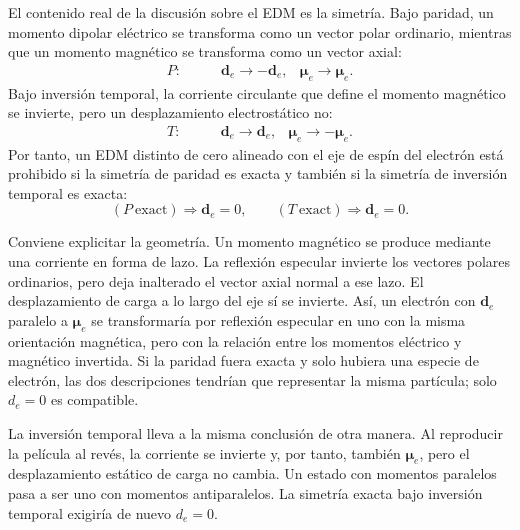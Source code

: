 El contenido real de la discusión sobre el EDM es la simetría. Bajo paridad, un momento dipolar eléctrico se transforma como un vector polar ordinario, mientras que un momento magnético se transforma como un vector axial:
\begin{align}
P:\qquad &\mathbf d_e \to -\mathbf d_e,
&\boldsymbol{\mu}_e \to \boldsymbol{\mu}_e .
\end{align}
Bajo inversión temporal, la corriente circulante que define el momento magnético se invierte, pero un desplazamiento electrostático no:
\begin{align}
T:\qquad &\mathbf d_e \to \mathbf d_e,
&\boldsymbol{\mu}_e \to -\boldsymbol{\mu}_e .
\end{align}
Por tanto, un EDM distinto de cero alineado con el eje de espín del electrón está prohibido si la simetría de paridad es exacta y también si la simetría de inversión temporal es exacta:
\begin{equation}
(P\ \text{exact}) \Rightarrow \mathbf d_e=0,
\qquad
(T\ \text{exact}) \Rightarrow \mathbf d_e=0.
\end{equation}

Conviene explicitar la geometría. Un momento magnético se produce mediante una corriente en forma de lazo. La reflexión especular invierte los vectores polares ordinarios, pero deja inalterado el vector axial normal a ese lazo. El desplazamiento de carga a lo largo del eje sí se invierte. Así, un electrón con \(\mathbf d_e\) paralelo a \(\boldsymbol\mu_e\) se transformaría por reflexión especular en uno con la misma orientación magnética, pero con la relación entre los momentos eléctrico y magnético invertida. Si la paridad fuera exacta y solo hubiera una especie de electrón, las dos descripciones tendrían que representar la misma partícula; solo \(d_e=0\) es compatible.

La inversión temporal lleva a la misma conclusión de otra manera. Al reproducir la película al revés, la corriente se invierte y, por tanto, también \(\boldsymbol\mu_e\), pero el desplazamiento estático de carga no cambia. Un estado con momentos paralelos pasa a ser uno con momentos antiparalelos. La simetría exacta bajo inversión temporal exigiría de nuevo \(d_e=0\).

